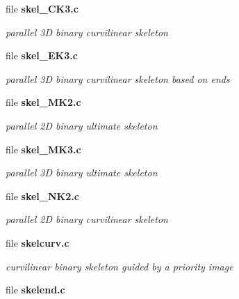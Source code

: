 \begin{DoxyCompactItemize}
\item 
file {\bf skel\_\-CK3.c}


\begin{DoxyCompactList}\small\item\em parallel 3D binary curvilinear skeleton \item\end{DoxyCompactList}

\item 
file {\bf skel\_\-EK3.c}


\begin{DoxyCompactList}\small\item\em parallel 3D binary curvilinear skeleton based on ends \item\end{DoxyCompactList}

\item 
file {\bf skel\_\-MK2.c}


\begin{DoxyCompactList}\small\item\em parallel 2D binary ultimate skeleton \item\end{DoxyCompactList}

\item 
file {\bf skel\_\-MK3.c}


\begin{DoxyCompactList}\small\item\em parallel 3D binary ultimate skeleton \item\end{DoxyCompactList}

\item 
file {\bf skel\_\-NK2.c}


\begin{DoxyCompactList}\small\item\em parallel 2D binary curvilinear skeleton \item\end{DoxyCompactList}

\item 
file {\bf skelcurv.c}


\begin{DoxyCompactList}\small\item\em curvilinear binary skeleton guided by a priority image \item\end{DoxyCompactList}

\item 
file {\bf skelend.c}



\end{DoxyCompactItemize}
